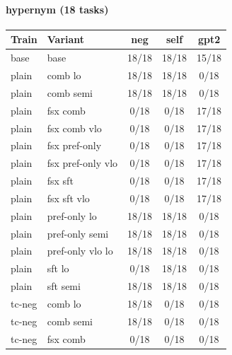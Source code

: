 \documentclass[10pt,landscape]{article}
\begin{document}
\paragraph{hypernym (18 tasks)}
\begin{tabular}{llccc}
\toprule
Train & Variant & neg & self & gpt2 \\
\midrule
base & base & \cellcolor{done}18/18 & \cellcolor{done}18/18 & \cellcolor{partial}15/18 \\
plain & comb lo & \cellcolor{done}18/18 & \cellcolor{done}18/18 & \cellcolor{missing}0/18 \\
plain & comb semi & \cellcolor{done}18/18 & \cellcolor{done}18/18 & \cellcolor{missing}0/18 \\
plain & fsx comb & \cellcolor{missing}0/18 & \cellcolor{missing}0/18 & \cellcolor{partial}17/18 \\
plain & fsx comb vlo & \cellcolor{missing}0/18 & \cellcolor{missing}0/18 & \cellcolor{partial}17/18 \\
plain & fsx pref-only & \cellcolor{missing}0/18 & \cellcolor{missing}0/18 & \cellcolor{partial}17/18 \\
plain & fsx pref-only vlo & \cellcolor{missing}0/18 & \cellcolor{missing}0/18 & \cellcolor{partial}17/18 \\
plain & fsx sft & \cellcolor{missing}0/18 & \cellcolor{missing}0/18 & \cellcolor{partial}17/18 \\
plain & fsx sft vlo & \cellcolor{missing}0/18 & \cellcolor{missing}0/18 & \cellcolor{partial}17/18 \\
plain & pref-only lo & \cellcolor{done}18/18 & \cellcolor{done}18/18 & \cellcolor{missing}0/18 \\
plain & pref-only semi & \cellcolor{done}18/18 & \cellcolor{done}18/18 & \cellcolor{missing}0/18 \\
plain & pref-only vlo lo & \cellcolor{done}18/18 & \cellcolor{done}18/18 & \cellcolor{missing}0/18 \\
plain & sft lo & \cellcolor{missing}0/18 & \cellcolor{done}18/18 & \cellcolor{missing}0/18 \\
plain & sft semi & \cellcolor{done}18/18 & \cellcolor{done}18/18 & \cellcolor{missing}0/18 \\
tc-neg & comb lo & \cellcolor{done}18/18 & \cellcolor{missing}0/18 & \cellcolor{missing}0/18 \\
tc-neg & comb semi & \cellcolor{done}18/18 & \cellcolor{missing}0/18 & \cellcolor{missing}0/18 \\
tc-neg & fsx comb & \cellcolor{missing}0/18 & \cellcolor{missing}0/18 & \cellcolor{missing}0/18 \\

\end{tabular}
\end{document}
